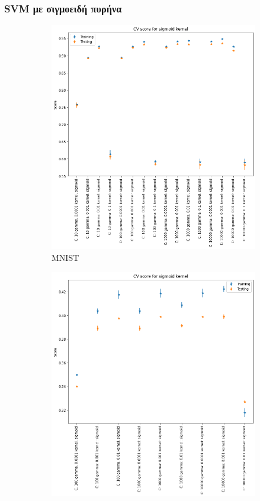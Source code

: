 \documentclass{beamer}
\begin{document}
\begin{frame}
\frametitle{SVM με σιγμοειδή πυρήνα}

\begin{figure}[H]
    \centering

    \begin{subfigure}[t]{0.45\linewidth}
    \includegraphics[width=\linewidth]{figures/mnist/cv_results_sigmoid.png}
    \caption{MNIST}
    \end{subfigure}
    \begin{subfigure}[t]{0.45\linewidth}
    \includegraphics[width=\linewidth]{figures/cifar/cv_results_sigmoid.png}

\end{subfigure}
\end{figure}
\end{frame}
\end{document}
